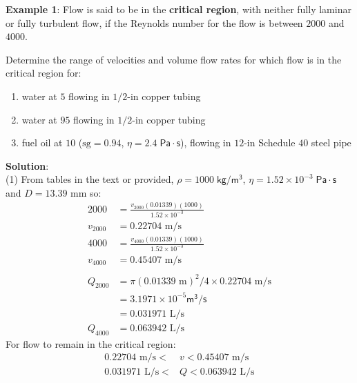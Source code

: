 \documentclass[10pt]{amsart}
\begin{document}

\newpage%
\large


\raggedright 



	\textbf{Example 1}:
		Flow is said to be in the \textbf{critical region}, with neither fully laminar or fully turbulent flow, if the Reynolds number for the 
		flow is between $2000$ and $4000$.
		\par\medskip
		Determine the range of velocities and volume flow rates for which flow is in the critical region for:
		\par\medskip
		\begin{enumerate}
		  \item water at $5$\textcelsius{} flowing in $1/2$-in copper tubing 
		  \item water at $95$\textcelsius{} flowing in $1/2$-in copper tubing
		  \item fuel oil at $10$\textcelsius{} ($\text{sg}=0.94$, $\eta=2.4\;\mathsf{Pa\cdot s}$), \newline flowing in $12$-in Schedule $40$ steel pipe
		\end{enumerate}
	
	\textbf{Solution}:\\
	(1)
	From tables in the text or provided, $\rho=1000\;\mathsf{kg/m^3}$, $ \eta=1.52\times 10^{-3}\;\mathsf{Pa\cdot s}$ and
	$D=13.39\text{ mm}$ so:
  	\begin{align*}  		
  		2000 &= \frac{v_{2000}(0.01339)(1000)}{1.52\times10^{-3}}\\
  		v_{2000} &= 0.22704\text{ m/s}\\
  		4000 &= \frac{v_{4000}(0.01339)(1000)}{1.52\times10^{-3}}\\
  		v_{4000} &= 0.45407\text{ m/s}\\\\
  		Q_{2000} &= \pi(0.01339\text{ m})^2/4\times 0.22704\text{ m/s}\\
  			&= 3.1971\times10^{-5}\mathsf{m^3/s}\\
  			&= 0.031971\text{ L/s}\\
  			Q_{4000} &= 0.063942\text{ L/s}
  	\end{align*}
  	For flow to remain in the critical region:
  	\begin{align*}
  		0.22704\text{ m/s} < &v < 0.45407\text{ m/s}\\
  		0.031971\text{ L/s} < &Q < 0.063942\text{ L/s}
  	\end{align*}
 
\end{document}
